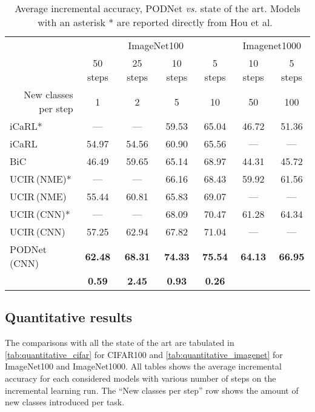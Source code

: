 \documentclass[runningheads]{llncs}
\begin{document}
 \begin{table*}[t]
\caption{Average incremental accuracy, PODNet \textit{vs.} state of the art. Models with an asterisk * are reported directly from Hou et al.~\cite{hou2019ucir}}
\label{tab:quantitative_imagenet}
\centering
\begin{tabular}{@{}l|cccc|cc@{}}
 \toprule
 & \multicolumn{4}{c|}{ImageNet100} & \multicolumn{2}{c}{Imagenet1000} \\
& 50 steps & 25 steps & 10 steps & 5 steps & 10 steps & 5 steps\\
 \multicolumn{1}{r|}{New classes per step} & 1 & 2 & 5 & 10 & 50 & 100\\
 \midrule
 iCaRL* \cite{rebuffi2017icarl}        & ---   & ---   & 59.53  & 65.04 & 46.72 & 51.36\\
 iCaRL \cite{rebuffi2017icarl}         & 54.97 & 54.56 & 60.90  & 65.56 & ---   & --- \\
 BiC \cite{wu2019bias_correction} & 46.49 & 59.65 & 65.14  & 68.97 & 44.31   & 45.72\\
 UCIR\,{\scriptsize (NME)}* \cite{hou2019ucir}    & ---   & ---   & 66.16  & 68.43 & 59.92 & 61.56\\
 UCIR\,{\scriptsize (NME)} \cite{hou2019ucir}     & 55.44 & 60.81 & 65.83  & 69.07 & ---   & --- \\
 UCIR\,{\scriptsize (CNN)}* \cite{hou2019ucir}    & ---   & ---   & 68.09  & 70.47 & 61.28 & 64.34\\
 UCIR\,{\scriptsize (CNN)} \cite{hou2019ucir}     & 57.25 & 62.94 & 67.82  & 71.04 & ---   & --- \\
PODNet\,{\scriptsize (CNN)}                & \textbf{62.48} & \textbf{68.31} & \textbf{74.33} & \textbf{75.54} & \textbf{64.13} & \textbf{66.95}\\

  & \scriptsize{\textbf{ 0.59}} & \scriptsize{\textbf{ 2.45}} & \scriptsize{\textbf{ 0.93}} & \scriptsize{\textbf{ 0.26}} & &\\

 \bottomrule
\end{tabular}
\end{table*} 
\subsection{Quantitative results}
\label{sec:quantitative_results}

The comparisons with all the state of the art are tabulated in \autoref{tab:quantitative_cifar} for CIFAR100 and \autoref{tab:quantitative_imagenet} for ImageNet100 and ImageNet1000. All tables shows the average incremental accuracy for each considered models with various number of steps on the incremental learning run. The ``New classes per step'' row shows the amount of new classes introduced per task. 
\end{document}
